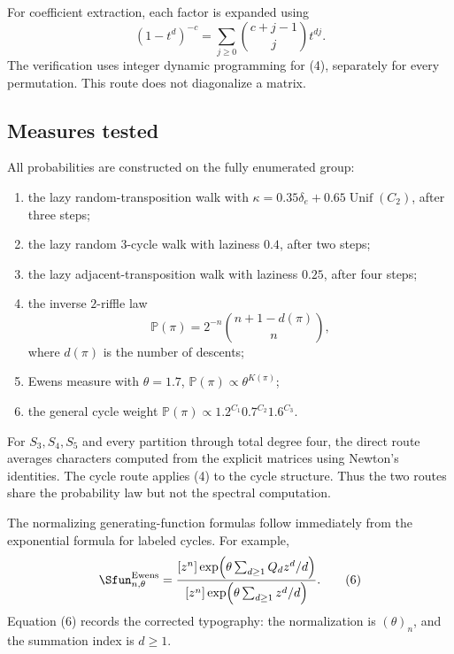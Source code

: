 \documentclass[10pt]{article}
\begin{document}
For coefficient extraction, each factor is expanded using
\begin{equation}
(1-t^d)^{-c}=\sum_{j\geq0}\binom{c+j-1}{j}t^{dj}.           \tag{4}
\end{equation}
The verification uses integer dynamic programming for (4), separately for
every permutation.  This route does not diagonalize a matrix.

\subsection{Measures tested}
All probabilities are constructed on the fully enumerated group:
\begin{enumerate}[leftmargin=*,itemsep=3pt]
\item the lazy random-transposition walk with
$\kappa=0.35\delta_e+0.65\operatorname{Unif}(C_2)$, after three steps;
\item the lazy random $3$-cycle walk with laziness $0.4$, after two steps;
\item the lazy adjacent-transposition walk with laziness $0.25$, after four steps;
\item the inverse $2$-riffle law
\begin{equation}
\mathbb P(\pi)=2^{-n}\binom{n+1-d(\pi)}{n},                \tag{5}
\end{equation}
where $d(\pi)$ is the number of descents;
\item Ewens measure with $\theta=1.7$,
$\mathbb P(\pi)\propto\theta^{K(\pi)}$;
\item the general cycle weight
$\mathbb P(\pi)\propto1.2^{C_1}0.7^{C_2}1.6^{C_3}$.
\end{enumerate}
For $S_3,S_4,S_5$ and every partition through total degree four, the direct
route averages characters computed from the explicit matrices using Newton's
identities.  The cycle route applies (4) to the cycle structure.  Thus the two
routes share the probability law but not the spectral computation.

The normalizing generating-function formulas follow immediately from the
exponential formula for labeled cycles.  For example,
\begin{equation}
\Sfun_{n,\theta}^{\mathrm{Ewens}}=
\frac{[z^n]\exp\!\left(\theta\sum_{d\geq1}Q_dz^d/d\right)}
{[z^n]\exp\!\left(\theta\sum_{d\geq1}z^d/d\right)}.        \tag{6}
\end{equation}
Equation (6) records the corrected typography: the normalization is
$(\theta)_n$, and the summation index is $d\geq1$.
\end{document}
